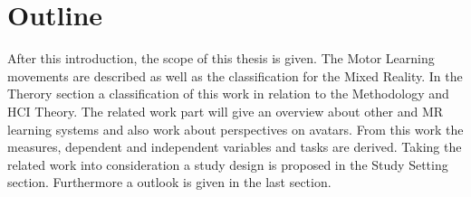 \section{Outline}
After this introduction, the scope of this thesis is given. The Motor Learning movements are described as well as the classification for the Mixed Reality. In the Therory section a classification of this work in relation to the Methodology and HCI Theory. The related work part will give an overview about other and MR learning systems and also work about perspectives on avatars. From this work the measures, dependent and independent variables and tasks are derived. Taking the related work into consideration a study design is proposed in the Study Setting section. Furthermore a outlook is given in the last section.
